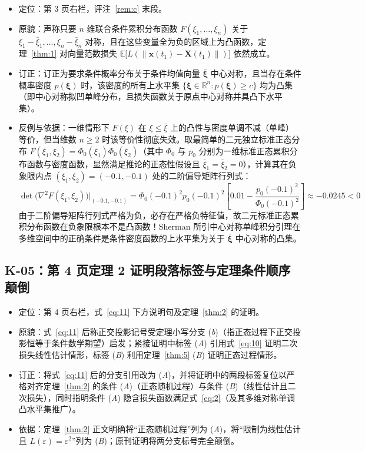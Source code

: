 \begin{itemize}
\item 定位：第 3 页右栏，评注~\ref{rem:c} 末段。
\item 原貌：声称只要 $n$ 维联合条件累积分布函数 $F(\xi_1, \dots, \xi_n)$ 关于 $\xi_1 - \bar{\xi}_1, \dots, \xi_n - \bar{\xi}_n$ 对称，且在这些变量全为负的区域上为凸函数，定理~\ref{thm:1} 对向量范数损失 $\mathbb{E}\bigl[L(\|\bm{x}(t_1) - \bm{X}(t_1)\|)\bigr]$ 依然成立。
\item 订正：订正为要求条件概率分布关于条件均值向量 $\bar{\bm{\xi}}$ 中心对称，且当存在条件概率密度 $p(\bm{\xi})$ 时，该密度的所有上水平集 $\{\bm{\xi} \in \mathbb{R}^n : p(\bm{\xi}) \geq c\}$ 均为凸集（即中心对称拟凹单峰分布，且损失函数关于原点中心对称并具凸下水平集）。
\item 反例与依据：一维情形下 $F(\xi)$ 在 $\xi \leq \bar{\xi}$ 上的凸性与密度单调不减（单峰）等价，但当维数 $n \geq 2$ 时该等价性彻底失效。取最简单的二元独立标准正态分布 $F(\xi_1, \xi_2) = \Phi_0(\xi_1)\Phi_0(\xi_2)$（其中 $\Phi_0$ 与 $p_0$ 分别为一维标准正态累积分布函数与密度函数，显然满足推论的正态性假设且 $\bar{\xi}_1 = \bar{\xi}_2 = 0$），计算其在负象限内点 $(\xi_1, \xi_2) = (-0.1, -0.1)$ 处的二阶偏导矩阵行列式：
\begin{equation*}
\det\bigl(\nabla^2 F(\xi_1, \xi_2)\bigr)\big|_{(-0.1, -0.1)} = \Phi_0(-0.1)^2 p_0(-0.1)^2 \left[0.01 - \frac{p_0(-0.1)^2}{\Phi_0(-0.1)^2}\right] \approx -0.0245 < 0
\end{equation*}
由于二阶偏导矩阵行列式严格为负，必存在严格负特征值，故二元标准正态累积分布函数在负象限根本不是凸函数！Sherman\cite{r25} 所引中心对称单峰积分引理在多维空间中的正确条件是条件密度函数的上水平集为关于 $\bar{\bm{\xi}}$ 中心对称的凸集。
\end{itemize}

\subsection{K-05：第 4 页定理 2 证明段落标签与定理条件顺序颠倒}\label{sec:k05}

\begin{itemize}
\item 定位：第 4 页右栏，式~\eqref{eq:11} 下方说明句及定理~\ref{thm:2} 的证明。
\item 原貌：式~\eqref{eq:11} 后称正交投影记号受定理小写分支 (\emph{b})（指正态过程下正交投影恒等于条件数学期望）启发；紧接证明中标签 (\emph{A}) 引用式~\eqref{eq:10} 证明二次损失线性估计情形，标签 (\emph{B}) 利用定理~\ref{thm:5} (\emph{B}) 证明正态过程情形。
\item 订正：将式~\eqref{eq:11} 后的分支引用改为 (\emph{A})，并将证明中的两段标签复位以严格对齐定理~\ref{thm:2} 的条件 (\emph{A})（正态随机过程）与条件 (\emph{B})（线性估计且二次损失），同时指明条件 (\emph{A}) 隐含损失函数满足式~\eqref{eq:2}（及其多维对称单调凸水平集推广）。
\item 依据：定理~\ref{thm:2} 正文明确将“正态随机过程”列为 (\emph{A})，将“限制为线性估计且 $L(\varepsilon) = \varepsilon^2$”列为 (\emph{B})；原刊证明将两分支标号完全颠倒。
\end{itemize}


